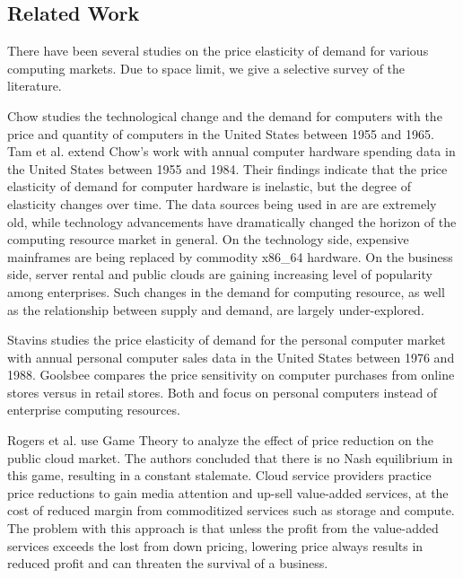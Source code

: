\documentclass[10pt,journal,cspaper,compsoc]{IEEEtran}
\begin{document}
\subsection{Related Work}
There have been several studies on the price elasticity of demand for various computing markets. Due to space limit, we give a selective survey of the literature.

Chow \cite{chow} studies the technological change and the demand for computers with the price and quantity of computers in the United States between 1955 and 1965. Tam et al. \cite{tam} extend Chow's work with annual computer hardware spending data in the United States between 1955 and 1984. Their findings indicate that the price elasticity of demand for computer hardware is inelastic, but the degree of elasticity changes over time. The data sources being used in \cite{chow} are \cite{tam} are extremely old, while technology advancements have dramatically changed the horizon of the computing resource market in general. %
On the technology side, expensive mainframes are being replaced by commodity x86\_64 hardware. On the business side, server rental and public clouds are gaining increasing level of popularity among enterprises. Such changes in the demand for computing resource, as well as the relationship between supply and demand, are largely under-explored.

Stavins \cite{stavins} studies the price elasticity of demand for the personal computer market with annual personal computer sales data in the United States between 1976 and 1988. Goolsbee \cite{goolsbee} compares the price sensitivity on computer purchases from online stores versus in retail stores. Both \cite{stavins} and \cite{goolsbee} focus on personal computers instead of enterprise computing resources.

Rogers et al. \cite{451research} use Game Theory to analyze the effect of price reduction on the public cloud market. The authors concluded that there is no Nash equilibrium in this game, resulting in a constant stalemate. Cloud service providers practice price reductions to gain media attention and up-sell value-added services, at the cost of reduced margin from commoditized services such as storage and compute. The problem with this approach is that unless the profit from the value-added services exceeds the lost from down pricing, lowering price always results in reduced profit and can threaten the survival of a business. 
\end{document}
